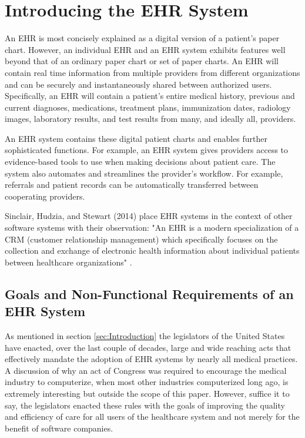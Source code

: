 \documentclass[10pt]{article}
\begin{document}
\section{Introducing the EHR System}
\label{sec:Intro_EHR}

An EHR is most concisely explained as a digital version of a patient's paper chart.
However, an individual EHR and an EHR system exhibits features well beyond that of an ordinary paper chart or set of paper charts.
An EHR will contain real time information from multiple providers from different organizations and can be securely and instantaneously shared between authorized users.
Specifically, an EHR will contain a patient's entire medical history, previous and current diagnoses, medications, treatment plans, immunization dates, radiology images, laboratory results, and test results from many, and ideally all, providers.

An EHR system contains these digital patient charts and enables further sophisticated functions.
For example, an EHR system gives providers access to evidence-based tools to use when making decisions about patient care.
The system also automates and streamlines the provider's workflow. For example, referrals and patient records can be automatically transferred between cooperating providers.
\cite{healthit-ehr}

Sinclair, Hudzia, and Stewart (2014) place EHR systems in the context of other software systems with their observation: "An EHR is a modern specialization of a CRM (customer relationship management) which specifically focuses on the collection and exchange of electronic health information about individual patients between healthcare organizations" \cite{auditingprivacy}.


\subsection{Goals and Non-Functional Requirements of an EHR System}
\label{sec:Goals of an EHR}

As mentioned in section \ref{sec:Introduction} the legislators of the United States have enacted, over the last couple of decades, large and wide reaching acts that effectively mandate the adoption of EHR systems by nearly all medical practices.
A discussion of why an act of Congress was required to encourage the medical industry to computerize, when most other industries computerized long ago, is extremely interesting but outside the scope of this paper.
However, suffice it to say, the legislators enacted these rules with the goals of improving the quality and efficiency of care for all users of the healthcare system and not merely for the benefit of software companies.
\end{document}
